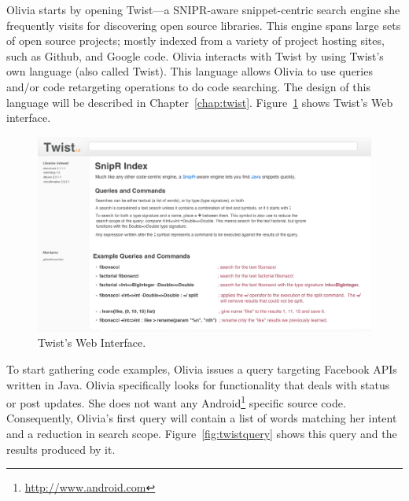 Olivia starts by opening Twist---a \uppercase{SnipR}-aware snippet-centric search engine she frequently visits for discovering open source libraries. This engine spans large sets of open source projects; mostly indexed from a variety of project hosting sites, such as Github, and Google code. Olivia interacts with Twist by using Twist's own language (also called Twist). This language allows Olivia to use queries and/or code retargeting operations to do code searching. The design of this language will be described in Chapter~\ref{chap:twist}. Figure~\ref{fig:twist} shows Twist's Web interface. 

\begin{figure}[!ht]
    \centering
    \includegraphics[width=\textwidth]{images/twistsite}
    \caption{Twist's Web Interface.}
    \label{fig:twist}
\end{figure}

To start gathering code examples, Olivia issues a query targeting Facebook APIs written in Java. Olivia specifically looks for functionality that deals with status or post updates. She does not want any Android\footnote{\url{http://www.android.com}} specific source code. Consequently, Olivia's first query will contain a list of words matching her intent and a reduction in search scope. Figure~\ref{fig:twistquery} shows this query and the results produced by it. 

